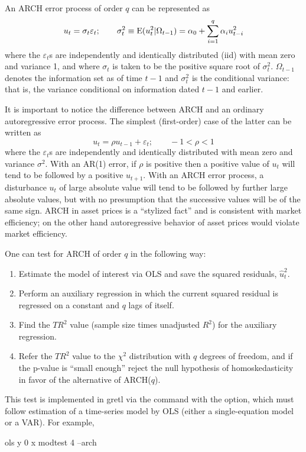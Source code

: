 An ARCH error process of order $q$ can be represented as
\[
u_t = \sigma_t \varepsilon_t; \qquad
\sigma^2_t \equiv {\rm E}(u^2_t|\Omega_{t-1}) = 
\alpha_0 + \sum_{i=1}^q \alpha_i u^2_{t-i}
\]
where the $\varepsilon_t$s are independently and identically
distributed (iid) with mean zero and variance 1, and where $\sigma_t$
is taken to be the positive square root of $\sigma^2_t$.
$\Omega_{t-1}$ denotes the information set as of time $t-1$ and
$\sigma^2_t$ is the conditional variance: that is, the
variance conditional on information dated $t-1$ and earlier.

It is important to notice the difference between ARCH and an ordinary
autoregressive error process.  The simplest (first-order) case of the
latter can be written as
\[
u_t = \rho u_{t-1} + \varepsilon_t; \qquad -1 < \rho < 1
\]
where the $\varepsilon_t$s are independently and identically
distributed with mean zero and variance $\sigma^2$.  With an AR(1)
error, if $\rho$ is positive then a positive value of $u_t$ will tend
to be followed by a positive $u_{t+1}$.  With an ARCH error process, a
disturbance $u_t$ of large absolute value will tend to be followed by
further large absolute values, but with no presumption that the
successive values will be of the same sign.  ARCH in asset prices is a
``stylized fact'' and is consistent with market efficiency; on the
other hand autoregressive behavior of asset prices would violate
market efficiency.

One can test for ARCH of order $q$ in the following
way:
\begin{enumerate}
\item Estimate the model of interest via OLS and save the squared
  residuals, $\hat{u}^2_t$.
\item Perform an auxiliary regression in which the current squared
  residual is regressed on a constant and $q$ lags of itself.
\item Find the $TR^2$ value (sample size times unadjusted $R^2$) for
  the auxiliary regression.
\item Refer the $TR^2$ value to the $\chi^2$ distribution with $q$
  degrees of freedom, and if the p-value is ``small enough'' reject
  the null hypothesis of homoskedasticity in favor of the alternative
  of ARCH($q$).
\end{enumerate}

This test is implemented in gretl via the  command
with the  option, which must follow estimation of a
time-series model by OLS (either a single-equation model or a
VAR). For example,
%
\begin{code}
ols y 0 x
modtest 4 --arch
\end{code}

